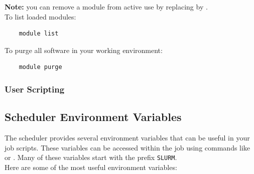 \documentclass{easychair}
\begin{document}
\noindent
\textbf{Note:} you can remove a module from active use by replacing  by .\\
    
\noindent To list loaded modules:
\begin{verbatim}
    module list
\end{verbatim}
    
\noindent To purge all software in your working environment:
\begin{verbatim}
    module purge
\end{verbatim}

\subsubsection{User Scripting}
\label{sect:scripting}



\subsection{Scheduler Environment Variables}
\label{sect:env-vars}

The scheduler provides several environment variables that can be useful in your job scripts. 
These variables can be accessed within the job using commands like  or . 
Many of these variables start with the prefix \texttt{SLURM}.\\

\noindent Here are some of the most useful environment variables:
\end{document}
